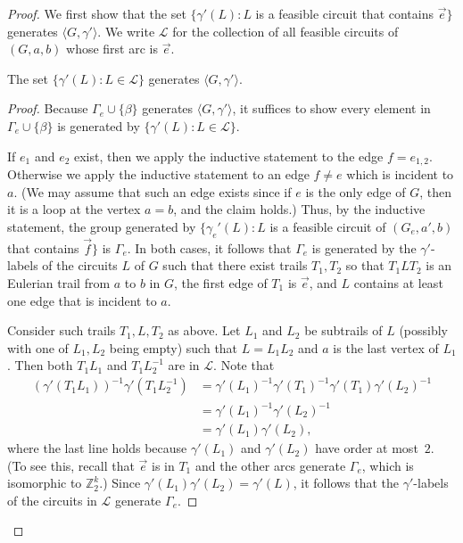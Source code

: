 \documentclass[a4paper, 12pt]{article}
\begin{document}
\begin{proof}
    We first show that the set $\{\gamma'(L) : L$ is a feasible circuit that contains $\vec{e}\}$ generates $\langle G, \gamma'\rangle$. We write $\mathcal{L}$ for the collection of all feasible circuits of $(G, a, b)$ whose first arc is $\vec{e}$. 

    \begin{claim}
    \label{clm:ecircuit}
        The set $\{\gamma'(L): L \in \mathcal{L}\}$ generates $\langle G, \gamma'\rangle$.
    \end{claim}
    \begin{proof}
        Because $\Gamma_e \cup \{\beta\}$ generates $\langle G, \gamma'\rangle$, it suffices to show every element in $\Gamma_e \cup \{\beta\}$ is generated by $\{\gamma'(L): L \in \mathcal{L}\}$.
    
        If $e_1$ and $e_2$ exist, then we apply the inductive statement to the edge $f = e_{1,2}$. Otherwise we apply the inductive statement to an edge $f\neq e$ which is incident to $a$. (We may assume that such an edge exists since if $e$ is the only edge of $G$, then it is a loop at the vertex $a=b$, and the claim holds.) Thus, by the inductive statement, the group generated by $\{\gamma_e'(L): L$ is a feasible circuit of $(G_e, a', b)$ that contains $\vec{f}\}$ is $\Gamma_e$. In both cases, it follows that $\Gamma_e$ is generated by the $\gamma'$-labels of the circuits $L$ of $G$ such that there exist trails $T_1, T_2$ so that $T_1 L T_2$ is an Eulerian trail from $a$ to $b$ in $G$, the first edge of $T_1$ is $\vec{e}$, and $L$ contains at least one edge that is incident to $a$. 

        Consider such trails $T_1, L, T_2$ as above. Let $L_1$ and $L_2$ be subtrails of $L$ (possibly with one of $L_1, L_2$ being empty) such that $L=L_1 L_2$ and $a$ is the last vertex of $L_1$. Then both $T_1 L_1$ and $T_1 L_2^{-1}$ are in $\mathcal{L}$. Note that \begin{align*}
        (\gamma'(T_1 L_1))^{-1}\gamma'(T_1 L_2^{-1})&=\gamma'(L_1)^{-1}\gamma'(T_1)^{-1}\gamma'(T_1)\gamma'(L_2)^{-1}\\&=\gamma'(L_1)^{-1}\gamma'(L_2)^{-1}\\&=\gamma'(L_1)\gamma'(L_2),
        \end{align*}where the last line holds because $\gamma'(L_1)$ and $\gamma'(L_2)$ have order at most~$2$. (To see this, recall that $\vec{e}$ is in $T_1$ and the other arcs generate $\Gamma_e$, which is isomorphic to $\mathbb{Z}_2^k$.) Since $\gamma'(L_1)\gamma'(L_2)= \gamma'(L)$, it follows that the $\gamma'$-labels of the circuits in $\mathcal{L}$ generate $\Gamma_e$.
    

\end{proof}
\end{proof}
\end{document}
